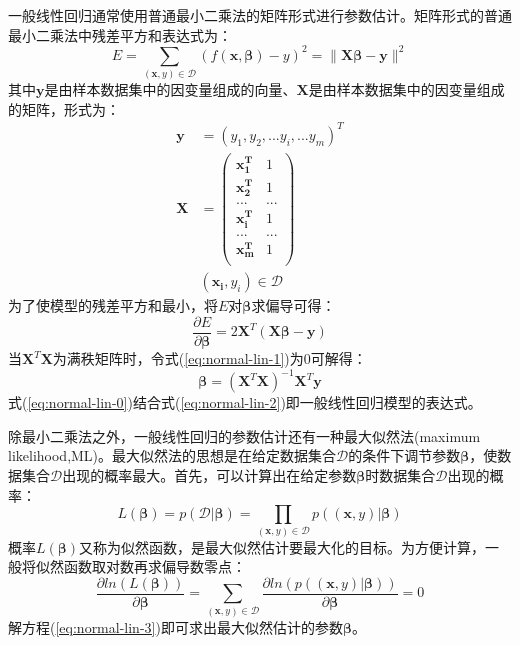 \documentclass[a4paper]{ctexart}
\begin{document}
\begin{spacing}{1.3}
	一般线性回归通常使用普通最小二乘法的矩阵形式进行参数估计。矩阵形式的普通最小二乘法中残差平方和表达式为：
	\begin{equation}
	E=\sum_{(\bm{x},y)\in \mathcal{D}}(f(\bm{x},\bm{\beta})-y)^2
	=\|\bm{X\beta-y}\|^2
	\end{equation}
	其中$\bm{y}$是由样本数据集中的因变量组成的向量、$\bm{X}$是由样本数据集中的因变量组成的矩阵，形式为：
	\begin{equation}
	\begin{split}
	\bm{y}&=(y_1,y_2,...y_i,...y_m)^T\\
	\bm{X}&=
	\begin{pmatrix}
	\bm{x_1^T}&1\\
	\bm{x_2^T}&1\\
	...&...\\
	\bm{x_i^T}&1\\
	...&...\\
	\bm{x_m^T}&1\\
	\end{pmatrix}\\
	&(\bm{x_i},y_i)\in \mathcal{D}
	\end{split}
	\end{equation}
	为了使模型的残差平方和最小，将$E$对$\bm{\beta}$求偏导可得：
	\begin{equation}\label{eq:normal-lin-1}
	\frac{\partial E}{\partial \bm{\beta}}=2\bm{X}^T(\bm{X}\bm{\beta}-\bm{y})
	\end{equation}
	当$\bm{X}^T\bm{X}$为满秩矩阵时，令式(\ref{eq:normal-lin-1})为0可解得：
	\begin{equation}\label{eq:normal-lin-2}
	\bm{\beta}=(\bm{X}^T\bm{X})^{-1}\bm{X}^T\bm{y}
	\end{equation}
	式(\ref{eq:normal-lin-0})结合式(\ref{eq:normal-lin-2})即一般线性回归模型的表达式\cite{RN90}。
	
	除最小二乘法之外，一般线性回归的参数估计还有一种最大似然法(maximum likelihood,ML)。最大似然法的思想是在给定数据集合$\mathcal{D}$的条件下调节参数$\bm\beta$，使数据集合$\mathcal{D}$出现的概率最大。首先，可以计算出在给定参数$\bm\beta$时数据集合$\mathcal{D}$出现的概率：
	\begin{equation}
	L(\bm\beta)=p(\mathcal{D}|\bm\beta)=\prod_{(\bm{x},y)\in \mathcal{D}}p((\bm x,y)|\bm\beta)
	\end{equation}
	概率$L(\bm\beta)$又称为似然函数，是最大似然估计要最大化的目标。为方便计算，一般将似然函数取对数再求偏导数零点：
	\begin{equation}\label{eq:normal-lin-3}
	\frac{\partial ln(L(\bm\beta))}{\partial\bm\beta}=\sum_{(\bm{x},y)\in \mathcal{D}}\frac{\partial ln(p((\bm x,y)|\bm\beta))}{\partial\bm\beta}=0
	\end{equation}
	解方程(\ref{eq:normal-lin-3})即可求出最大似然估计的参数$\bm\beta$。
	

\end{spacing}
\end{document}
